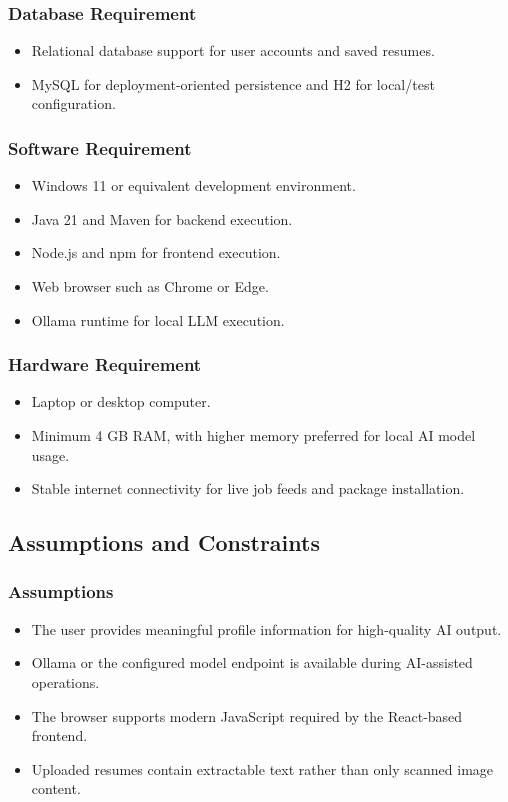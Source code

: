 \subsubsection{Database Requirement}
\begin{itemize}
\item Relational database support for user accounts and saved resumes.
\item MySQL for deployment-oriented persistence and H2 for local/test configuration.
\end{itemize}

\subsubsection{Software Requirement}
\begin{itemize}
\item Windows 11 or equivalent development environment.
\item Java 21 and Maven for backend execution.
\item Node.js and npm for frontend execution.
\item Web browser such as Chrome or Edge.
\item Ollama runtime for local LLM execution.
\end{itemize}

\subsubsection{Hardware Requirement}
\begin{itemize}
\item Laptop or desktop computer.
\item Minimum 4 GB RAM, with higher memory preferred for local AI model usage.
\item Stable internet connectivity for live job feeds and package installation.
\end{itemize}

\subsection{Assumptions and Constraints}
\subsubsection{Assumptions}
\begin{itemize}
\item The user provides meaningful profile information for high-quality AI output.
\item Ollama or the configured model endpoint is available during AI-assisted operations.
\item The browser supports modern JavaScript required by the React-based frontend.
\item Uploaded resumes contain extractable text rather than only scanned image content.
\end{itemize}


